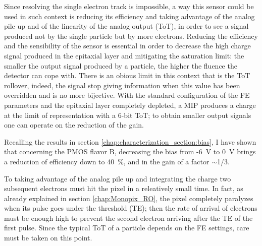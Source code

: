    Since resolving the single electron track is impossible, a way this sensor could be used in such context is reducing its efficiency and taking advantage of the analog pile up and of the linearity of the analog output (ToT), in order to see a signal produced not by the single particle but by more electrons. 
   Reducing the efficiency and the sensibility of the sensor is essential in order to decrease the high charge signal produced in the epitaxial layer and mitigating the saturation limit: the smaller the output signal produced by a particle, the higher the fluence the detector can cope with.
   There is an obious limit in this context that is the ToT rollover, indeed, the signal stop giving information when this value has been overridden and is no more bijective.
   With the standard configuration of the FE parameters and the epitaxial layer completely depleted, a MIP produces a charge at the limit of representation with a 6-bit ToT; to obtain smaller output signals one can operate on the reduction of the gain.

   Recalling the results in section \ref{chap:characterization_section:bias}, I have shown that concerning the PMOS flavor B, decreasing the bias from -\SI{6}{V} to \SI{0}{V} brings a reduction of efficiency down to \SI{40}{\%}, and in the gain of a factor $\sim$1/3.
   
   To taking advantage of the analog pile up and integrating the charge two subsequent electrons must hit the pixel in a releatively small time. In fact, as already explained in section \ref{chap:Monopix_RO}, the pixel completely paralyzes when its pulse goes under the threshold (TE); then the rate of arrival of electrons must be enough high to prevent the second electron arriving after the TE of the first pulse. Since the typical ToT of a particle depends on the FE settings, care must be taken on this point. 
   
